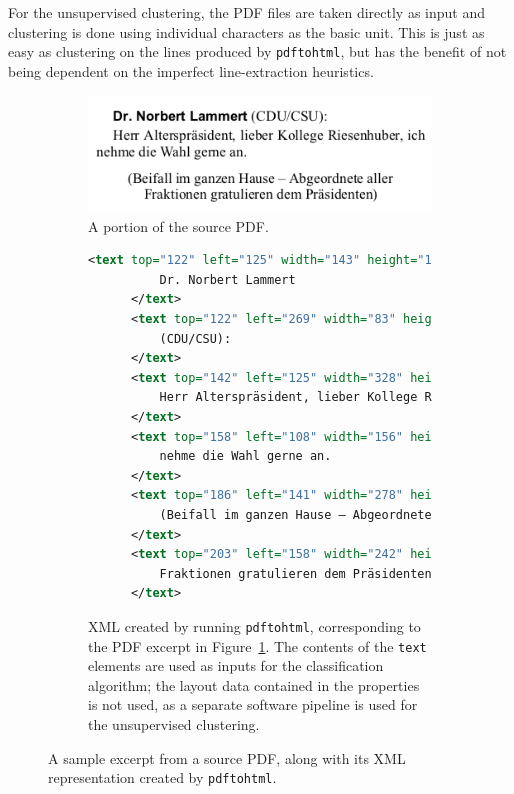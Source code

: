 For the unsupervised clustering, the PDF files are taken directly as input and
clustering is done using individual characters as the basic unit. This is just
as easy as clustering on the lines produced by \texttt{pdftohtml}, but has the
benefit of not being dependent on the imperfect line-extraction heuristics.

\begin{figure}[p]
  \centering
  \begin{subfigure}[b]{0.6\textwidth} 
    \includegraphics[width=\textwidth]{figures/source.png}
    \caption{A portion of the source PDF.\label{fig:source_pdf}}
    \vspace{1cm}
  \end{subfigure}
  \begin{subfigure}[b]{\textwidth}
    \begin{lstlisting}[language=xml, morekeywords={text}]
      <text top="122" left="125" width="143" height="16" font="3">
          Dr. Norbert Lammert 
      </text>
      <text top="122" left="269" width="83" height="17" font="4">
          (CDU/CSU):
      </text>
      <text top="142" left="125" width="328" height="17" font="4">
          Herr Alterspräsident, lieber Kollege Riesenhuber, ich
      </text>
      <text top="158" left="108" width="156" height="17" font="4">
          nehme die Wahl gerne an.
      </text>
      <text top="186" left="141" width="278" height="17" font="4">
          (Beifall im ganzen Hause – Abgeordnete aller
      </text>
      <text top="203" left="158" width="242" height="17" font="4">
          Fraktionen gratulieren dem Präsidenten)
      </text>
    \end{lstlisting}
    \caption{XML created by running \texttt{pdftohtml}, corresponding to the PDF
      excerpt in Figure~\ref{fig:source_pdf}. The contents of the \texttt{text}
      elements are used as inputs for the classification algorithm; the layout
      data contained in the properties is not used, as a separate software
    pipeline is used for the unsupervised clustering.\label{fig:source_xml}}
  \end{subfigure}
  \caption{A sample excerpt from a source PDF, along with its XML representation
    created by \texttt{pdftohtml}.\label{fig:example}}
\end{figure}


